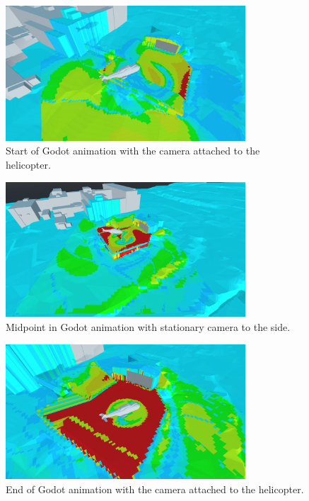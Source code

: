 \documentclass[a4paper,11pt]{extarticle}
\begin{document}
\begin{figure}[H]
  \centering
  \includegraphics[width=0.8\textwidth]{gfx/anim_heli_first.png}
  \caption{Start of Godot animation with the camera attached to the helicopter.}
  \label{fig:AnimHeliFirst}
\end{figure}

\begin{figure}[H]
  \centering
  \includegraphics[width=0.8\textwidth]{gfx/anim_side_mid.png}
  \caption{Midpoint in Godot animation with stationary camera to the side.}
  \label{fig:AnimSideMid}
\end{figure}

\begin{figure}[H]
  \centering
  \includegraphics[width=0.8\textwidth]{gfx/anim_heli_last.png}
  \caption{End of Godot animation with the camera attached to the helicopter.}
  \label{fig:AnimHeliLast}
\end{figure}
\end{document}
